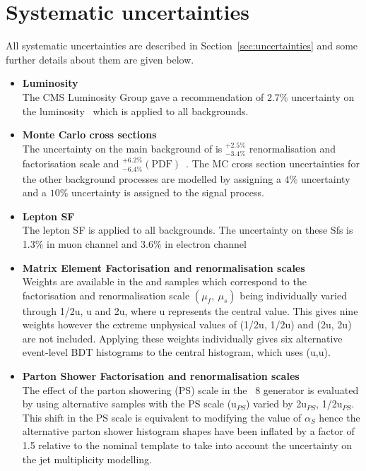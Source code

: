 \section{Systematic uncertainties}
\label{sec:uncertainties13}
All systematic uncertainties are described in Section~\ref{sec:uncertainties} and some further details about them are given below.

\begin{itemize}
\item \textbf{Luminosity}\\
The CMS Luminosity Group gave a recommendation of 2.7$\%$ uncertainty on the luminosity~\cite{CMS-PAS-LUM-15-001} which is applied to all backgrounds.
\item \textbf{Monte Carlo cross sections}\\
The uncertainty on the main background of \ttbar is ${}^{+2.5\%}_{-3.4\%}$ renormalisation and factorisation scale and ${}^{+6.2\%}_{-6.4\%} \left( \textrm{PDF} \right)$~\cite{PhysRevLett.110.252004}. The MC cross section uncertainties for the other background processes are modelled by assigning a $4\%$ uncertainty and a $10\%$ uncertainty is assigned to the signal process.
\item \textbf{Lepton SF}\\
The lepton SF is applied to all backgrounds. The uncertainty on these Sfs is 1.3$\%$ in muon channel and 3.6$\%$ in electron channel
\item \textbf{Matrix Element Factorisation and renormalisation scales}\\
Weights are available in the \ttbar and \tttt samples which correspond to the factorisation and renormalisation scale $\left(\mu_{f},~\mu_{s}\right)$ being individually varied through 1/2u, u and 2u, where u represents the central value. This gives nine weights however the extreme unphysical values of (1/2u, 1/2u) and (2u, 2u) are not included. Applying these weights individually gives six alternative event-level BDT histograms to the central histogram, which uses (u,u). 
\item \textbf{Parton Shower Factorisation and renormalisation scales}\\
The effect of the parton showering (PS) scale in the \PYTHIA~8 generator is evaluated by using alternative \ttbar samples with the PS scale (u$_{PS}$) varied by 2u$_{PS}$, 1/2u$_{PS}$. This shift in the PS scale is equivalent to modifying the value of $\alpha_{S}$ hence the alternative parton shower histogram shapes have been inflated by a factor of 1.5 relative to the nominal template to take into account the uncertainty on the jet multiplicity modelling.

\end{itemize}
